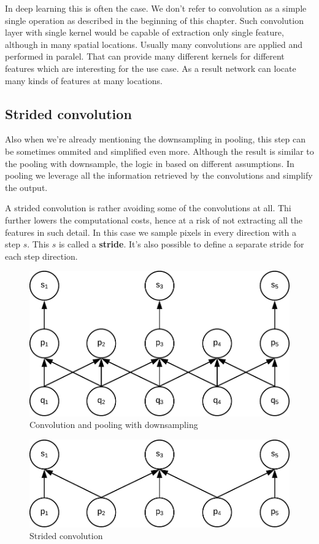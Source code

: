 In deep learning this is often the case. We don't refer to convolution as a simple single operation as described in the beginning of this chapter. Such convolution layer with single kernel would be capable of extraction only single feature, although in many spatial locations. Usually many convolutions are applied and performed in paralel. That can provide many different kernels for different features which are interesting for the use case. As a result network can locate many kinds of features at many locations.

\subsection{Strided convolution}

Also when we're already mentioning the downsampling in pooling, this step can be sometimes ommited and simplified even more. Although the result is similar to the pooling with downsample, the logic in based on different assumptions. In pooling we leverage all the information retrieved by the convolutions and simplify the output.

A strided convolution is rather avoiding some of the convolutions at all. Thi further lowers the computational costs, hence at a risk of not extracting all the features in such detail. In this case we sample pixels in every direction with a step $s$. This $s$ is called a \textbf{stride}. It's also possible to define a separate stride for each step direction.

\begin{figure}
    \centering
    \includegraphics[width=.6\textwidth]{obrazky-figures/conv_down.pdf}
    \caption{Convolution and pooling with downsampling}\label{fig:conv_down}
\end{figure}


\begin{figure}
    \centering
    \includegraphics[width=.6\textwidth]{obrazky-figures/strided.pdf}
    \caption{Strided convolution}\label{fig:strided}
\end{figure}


